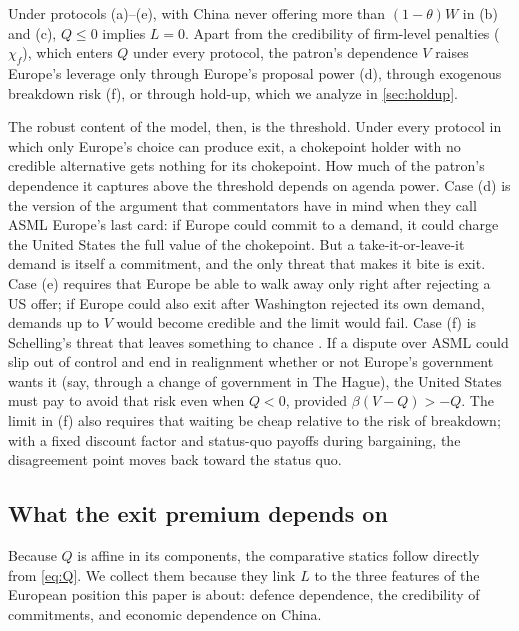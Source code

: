 \begin{corollary}\label{cor:necessary}
Under protocols (a)--(e), with China never offering more than $(1-\theta)W$ in (b) and (c), $Q \leq 0$ implies $L = 0$. Apart from the credibility of firm-level penalties ($\chi_f$), which enters $Q$ under every protocol, the patron's dependence $V$ raises Europe's leverage only through Europe's proposal power (d), through exogenous breakdown risk (f), or through hold-up, which we analyze in \cref{sec:holdup}.
\end{corollary}

The robust content of the model, then, is the threshold. Under every protocol in which only Europe's choice can produce exit, a chokepoint holder with no credible alternative gets nothing for its chokepoint. How much of the patron's dependence it captures above the threshold depends on agenda power. Case (d) is the version of the argument that commentators have in mind when they call ASML Europe's last card: if Europe could commit to a demand, it could charge the United States the full value of the chokepoint. But a take-it-or-leave-it demand is itself a commitment, and the only threat that makes it bite is exit. Case (e) requires that Europe be able to walk away only right after rejecting a US offer; if Europe could also exit after Washington rejected its own demand, demands up to $V$ would become credible and the limit would fail. Case (f) is Schelling's threat that leaves something to chance \citep{schelling1960strategy}. If a dispute over ASML could slip out of control and end in realignment whether or not Europe's government wants it (say, through a change of government in The Hague), the United States must pay to avoid that risk even when $Q<0$, provided $\beta(V-Q) > -Q$. The limit in (f) also requires that waiting be cheap relative to the risk of breakdown; with a fixed discount factor and status-quo payoffs during bargaining, the disagreement point moves back toward the status quo.

\subsection{What the exit premium depends on}\label{sec:statics}

Because $Q$ is affine in its components, the comparative statics follow directly from \cref{eq:Q}. We collect them because they link $L$ to the three features of the European position this paper is about: defence dependence, the credibility of commitments, and economic dependence on China.

